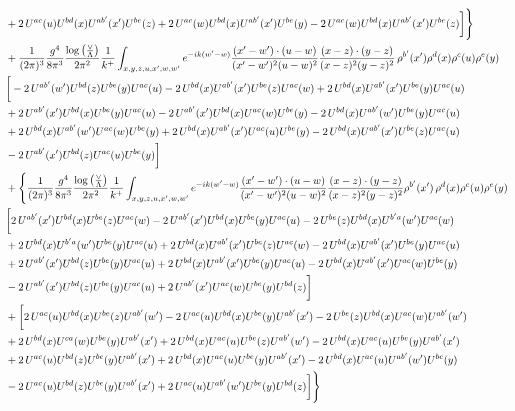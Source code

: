 \documentclass[aps,prd,amsmath,amssymb,nofootinbib]{revtex4-2}
\numberwithin{equation}{section}
\begin{document}
\begin{align}
    & +2\, U^{ac}(u)U^{bd}(x)U^{ab'}(x')U^{be}(z) + 2\,U^{ac}(w)U^{bd}(x)U^{ab'}(x')U^{be}(y)- 2\,U^{ac}(w)U^{bd}(x)U^{ab'}(x')U^{be}(z)\bigg]\Bigg\}\notag \\ & + \frac{1}{(2\pi)^{3}}\frac{g^{4}}{8\pi^{3}}\frac{\log{\left(\frac{\vee}{\Lambda}\right)}}{2\pi^{2}} \frac{1}{k^{+}}\int_{x,y,z,u,x^{\prime},w,w^{\prime}}e^{-ik(w^{\prime}-w)}\frac{(x^{\prime}-w^{\prime})\cdot (u-w)}{(x^{\prime}-w^{\prime})^{2} (u-w)^{2}} \frac{(x-z)\cdot (y-z)}{(x-z)^{2}(y-z)^{2}}\,\rho^{b'}(x^{\prime})\rho^{d}(x)\rho^{c}(u)\rho^{e}(y)\notag \\ & \bigg[-2\,U^{ab'}(w')U^{bd}(z)U^{be}(y)U^{ac}(u) - 2\,U^{bd}(x)U^{ab'}(x^{\prime})U^{be}(z)U^{ac}(w)+ 2\,U^{bd}(x)U^{ab'}(x')U^{be}(y)U^{ac}(u)\notag \\ & + 2\, U^{ab'}(x')U^{bd}(x)U^{be}(y)U^{ac}(u) - 2\,U^{ab'}(x')U^{bd}(x)U^{ac}(w)U^{be}(y) - 2\,U^{bd}(x)U^{ab'}(w')U^{be}(y)U^{ac}(u)\notag \\ &  + 2\, U^{bd}(x)U^{ab'}(w')U^{ac}(w)U^{be}(y) +2\, U^{bd}(x)U^{ab'}(x')U^{ac}(u)U^{be}(y) - 2\,U^{bd}(x)U^{ab'}(x')U^{be}(z)U^{ac}(u)\notag \\ &  - 2\, U^{ab'}(x')U^{bd}(z)U^{ac}(u)U^{be}(y)\bigg]\notag \\ & + \Bigg\{\frac{1}{(2\pi)^{3}}\frac{g^{4}}{8\pi^{3}}\frac{\log{\left(\frac{\vee}{\Lambda}\right)}}{2\pi^{2}} \frac{1}{k^{+}}\int_{x,y,z,u,x^{\prime},w,w^{\prime}}e^{-ik(w^{\prime}-w)}\frac{(x^{\prime}-w^{\prime})\cdot (u-w)}{(x^{\prime}-w^{\prime})^{2} (u-w)^{2}} \frac{(x-z)\cdot (y-z)}{(x-z)^{2}(y-z)^{2}}\rho^{b'}(x^{\prime})\,\rho^{d}(x)\rho^{c}(u)\rho^{e}(y)\notag \\ & \bigg[2\,U^{ab'}(x')U^{bd}(x)U^{be}(z)U^{ac}(w)-2\,U^{ab'}(x')U^{bd}(x)U^{be}(y)U^{ac}(u)-2\,U^{be}(z)U^{bd}(x)U^{b'a}(w')U^{ac}(w)\notag \\ &+2\,U^{bd}(x)U^{b'a}(w')U^{be}(y)U^{ac}(u) +2\,U^{bd}(x)U^{ab'}(x')U^{be}(z)U^{ac}(w) - 2\,U^{bd}(x)U^{ab'}(x')U^{be}(y)U^{ac}(u)\notag \\ & +2\,U^{ab'}(x')U^{bd}(z)U^{be}(y)U^{ac}(u)+2\,U^{bd}(x)U^{ab'}(x')U^{be}(y)U^{ac}(u) -2\, U^{bd}(x)U^{ab'}(x')U^{ac}(w)U^{be}(y)\notag \\ & -2\,  U^{ab'}(x')U^{bd}(z)U^{be}(y)U^{ac}(u) + 2\, U^{ab'}(x')U^{ac}(w)U^{be}(y)U^{bd}(z)\bigg]\notag \\ & +\bigg[2\,U^{ac}(u)U^{bd}(x)U^{be}(z)U^{ab'}(w') -2\,U^{ac}(u)U^{bd}(x)U^{be}(y)U^{ab'}(x')-2\,U^{be}(z)U^{bd}(x)U^{ac}(w)U^{ab'}(w')\notag \\ & +2\,U^{bd}(x)U^{ca}(w)U^{be}(y)U^{ab'}(x') +2\,U^{bd}(x)U^{ac}(u)U^{be}(z)U^{ab'}(w') -2\,U^{bd}(x)U^{ac}(u)U^{be}(y)U^{ab'}(x')\notag \\  & + 2\,U^{ac}(u)U^{bd}(z)U^{be}(y)U^{ab'}(x')+ 2\,U^{bd}(x)U^{ac}(u)U^{be}(y)U^{ab'}(x') -2\, U^{bd}(x)U^{ac}(u)U^{ab'}(w')U^{be}(y)\notag \\ & 
     -2\, U^{ac}(u)U^{bd}(z)U^{be}(y)U^{ab'}(x')+2\, U^{ac}(u)U^{ab'}(w')U^{be}(y)U^{bd}(z)\bigg]\Bigg\}
\end{align}
\end{document}
